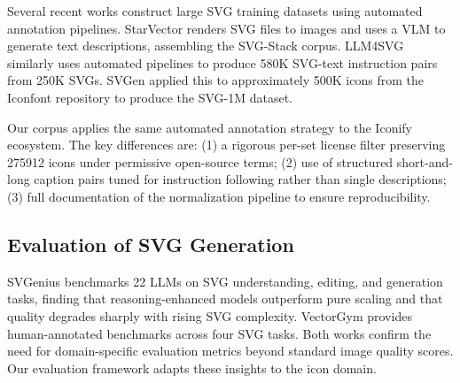 Several recent works construct large SVG training datasets using automated
annotation pipelines. StarVector \citep{rodriguez2025starvector} renders SVG
files to images and uses a VLM to generate text descriptions, assembling the
SVG-Stack corpus. LLM4SVG \citep{xing2025llm4svg} similarly uses automated
pipelines to produce 580K SVG-text instruction pairs from 250K SVGs. SVGen
\citep{svgen2025} applied this to approximately 500K icons from the Iconfont
repository to produce the SVG-1M dataset.

Our \dataset{} corpus applies the same automated annotation strategy to the
Iconify ecosystem. The key differences are: (1) a rigorous per-set license
filter preserving \num{275912} icons under permissive open-source terms;
(2) use of structured short-and-long caption pairs tuned for instruction
following rather than single descriptions; (3) full documentation of the
normalization pipeline to ensure reproducibility.

\subsection{Evaluation of SVG Generation}

SVGenius \citep{tang2025svgenius} benchmarks 22 LLMs on SVG understanding,
editing, and generation tasks, finding that reasoning-enhanced models outperform
pure scaling and that quality degrades sharply with rising SVG complexity.
VectorGym \citep{vectorgym2025} provides human-annotated benchmarks across four
SVG tasks. Both works confirm the need for domain-specific evaluation metrics
beyond standard image quality scores. Our evaluation framework adapts these
insights to the icon domain.

